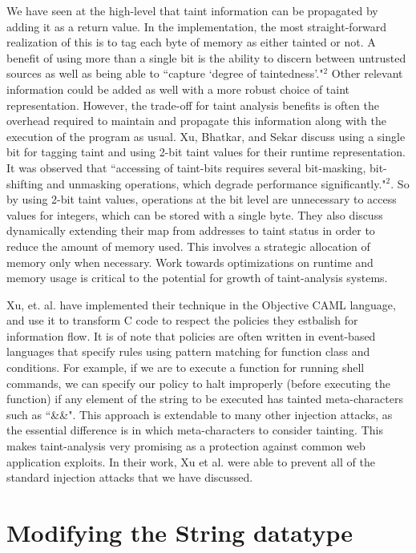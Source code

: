 \documentclass[11pt]{article}
\begin{document}
We have seen at the high-level that taint information can be propagated by 
adding it as a return value. In the implementation, the most straight-forward 
realization of this is to tag each byte of memory as either tainted or not.
A benefit of using more than a single bit is the ability to discern between untrusted 
sources as well as being able to ``capture `degree of taintedness'."$^2$ 
Other relevant
information could be added as well with a more robust choice of taint representation. 
However, the trade-off for taint analysis benefits is often the overhead required
to maintain and propagate this information along with the execution of the program
as usual. Xu, Bhatkar, and Sekar discuss using a single bit for tagging taint 
and using 2-bit taint values for their runtime representation. It was observed
that ``accessing of taint-bits requires several bit-masking, bit-shifting and unmasking
operations, which degrade performance significantly."$^2$. So by using 2-bit taint 
values, operations at the bit level are unnecessary to access values for integers, which can be stored with a single byte.
They also discuss dynamically extending their map from addresses 
to taint status in order to reduce the amount of memory used. This involves a strategic
allocation of memory only when necessary. Work towards optimizations
on runtime and memory usage is critical to the potential for growth
of taint-analysis systems. 

Xu, et. al. have implemented their technique in the Objective CAML language,
and use it to transform C code to respect the policies they estbalish for information
flow. It is of note that policies are often written in event-based languages that
specify rules using pattern matching for function class and conditions. For example,
if we are to execute a function for running shell commands, we can specify our policy
to halt improperly (before executing the function) if any element of the string to be 
executed has tainted meta-characters such as ``\&\&".  This approach is extendable to 
many other injection attacks, as the essential difference is in which meta-characters
to consider tainting. This makes taint-analysis very promising as a protection
against common web application exploits. In their work, Xu et al. were able to prevent
all of the standard injection attacks that we have discussed. 

\section*{Modifying the String datatype}
\end{document}
